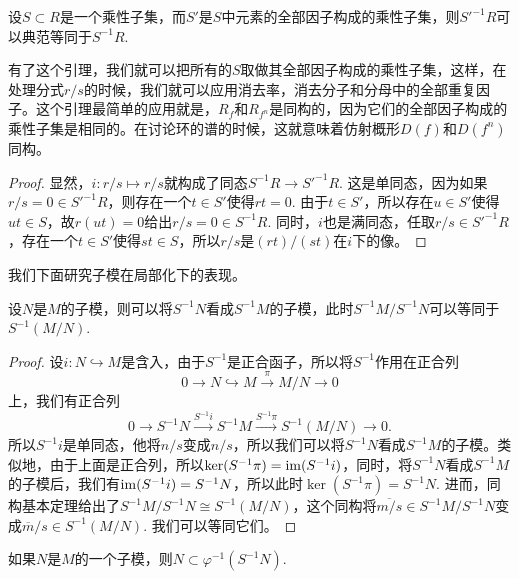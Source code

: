 \begin{lem}
	设$S\subset R$是一个乘性子集，而$S'$是$S$中元素的全部因子构成的乘性子集，则$S'^{-1}R$可以典范等同于$S^{-1}R$.
\end{lem}

有了这个引理，我们就可以把所有的$S$取做其全部因子构成的乘性子集，这样，在处理分式$r/s$的时候，我们就可以应用消去率，消去分子和分母中的全部重复因子。这个引理最简单的应用就是，$R_f$和$R_{f^n}$是同构的，因为它们的全部因子构成的乘性子集是相同的。在讨论环的谱的时候，这就意味着仿射概形$D(f)$和$D(f^n)$同构。

\begin{proof}
	显然，$i:r/s\mapsto r/s$就构成了同态$S^{-1}R\to S'^{-1}R$. 这是单同态，因为如果$r/s=0\in S'^{-1}R$，则存在一个$t\in S'$使得$rt=0$. 由于$t\in S'$，所以存在$u\in S'$使得$ut\in S$，故$r(ut)=0$给出$r/s=0\in S^{-1}R$. 同时，$i$也是满同态，任取$r/s\in S'^{-1}R$，存在一个$t\in S'$使得$st\in S$，所以$r/s$是$(rt)/(st)$在$i$下的像。
\end{proof}

我们下面研究子模在局部化下的表现。

\begin{pro}
	设$N$是$M$的子模，则可以将$S^{-1}N$看成$S^{-1}M$的子模，此时$S^{-1}M/S^{-1}N$可以等同于$S^{-1}(M/N)$.
\end{pro}

\begin{proof}
	设$i:N\hookrightarrow M$是含入，由于$S^{-1}$是正合函子，所以将$S^{-1}$作用在正合列
	\[
		0\to N\hookrightarrow M\xrightarrow{\pi} M/N\to 0
	\]
	上，我们有正合列
	\[
		0\to S^{-1}N\xrightarrow{S^{-1}i}S^{-1}M\xrightarrow{S^{-1}\pi} S^{-1}(M/N)\to 0.
	\]
	所以$S^{-1}i$是单同态，他将$n/s$变成$n/s$，所以我们可以将$S^{-1}N$看成$S^{-1}M$的子模。类似地，由于上面是正合列，所以$\ker (S^{-1}\pi)=\operatorname{im} (S^{-1}i)$，同时，将$S^{-1}N$看成$S^{-1}M$的子模后，我们有$\operatorname{im} (S^{-1}i)=S^{-1}N$，所以此时$\ker (S^{-1}\pi)=S^{-1}N$. 进而，同构基本定理给出了$S^{-1}M/S^{-1}N\cong S^{-1}(M/N)$，这个同构将$\overline{m/s}\in S^{-1}M/S^{-1}N$变成$\overline m/s\in S^{-1}(M/N)$. 我们可以等同它们。
\end{proof}


\begin{lem}
	如果$N$是$M$的一个子模，则$N\subset \varphi^{-1}(S^{-1}N)$. 
\end{lem}

